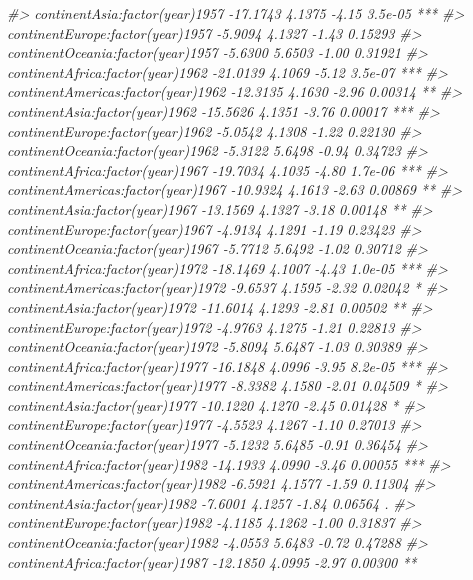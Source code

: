 \documentclass[]{book}
\newenvironment{Shaded}{\begin{snugshade}}{\end{snugshade}}
\newcommand{\CommentTok}[1]{\textcolor[rgb]{0.56,0.35,0.01}{\textit{#1}}}
\begin{document}
\begin{Shaded}
\begin{Highlighting}[]
\CommentTok{#> continentAsia:factor(year)1957     -17.1743     4.1375   -4.15  3.5e-05 ***}
\CommentTok{#> continentEurope:factor(year)1957    -5.9094     4.1327   -1.43  0.15293    }
\CommentTok{#> continentOceania:factor(year)1957   -5.6300     5.6503   -1.00  0.31921    }
\CommentTok{#> continentAfrica:factor(year)1962   -21.0139     4.1069   -5.12  3.5e-07 ***}
\CommentTok{#> continentAmericas:factor(year)1962 -12.3135     4.1630   -2.96  0.00314 ** }
\CommentTok{#> continentAsia:factor(year)1962     -15.5626     4.1351   -3.76  0.00017 ***}
\CommentTok{#> continentEurope:factor(year)1962    -5.0542     4.1308   -1.22  0.22130    }
\CommentTok{#> continentOceania:factor(year)1962   -5.3122     5.6498   -0.94  0.34723    }
\CommentTok{#> continentAfrica:factor(year)1967   -19.7034     4.1035   -4.80  1.7e-06 ***}
\CommentTok{#> continentAmericas:factor(year)1967 -10.9324     4.1613   -2.63  0.00869 ** }
\CommentTok{#> continentAsia:factor(year)1967     -13.1569     4.1327   -3.18  0.00148 ** }
\CommentTok{#> continentEurope:factor(year)1967    -4.9134     4.1291   -1.19  0.23423    }
\CommentTok{#> continentOceania:factor(year)1967   -5.7712     5.6492   -1.02  0.30712    }
\CommentTok{#> continentAfrica:factor(year)1972   -18.1469     4.1007   -4.43  1.0e-05 ***}
\CommentTok{#> continentAmericas:factor(year)1972  -9.6537     4.1595   -2.32  0.02042 *  }
\CommentTok{#> continentAsia:factor(year)1972     -11.6014     4.1293   -2.81  0.00502 ** }
\CommentTok{#> continentEurope:factor(year)1972    -4.9763     4.1275   -1.21  0.22813    }
\CommentTok{#> continentOceania:factor(year)1972   -5.8094     5.6487   -1.03  0.30389    }
\CommentTok{#> continentAfrica:factor(year)1977   -16.1848     4.0996   -3.95  8.2e-05 ***}
\CommentTok{#> continentAmericas:factor(year)1977  -8.3382     4.1580   -2.01  0.04509 *  }
\CommentTok{#> continentAsia:factor(year)1977     -10.1220     4.1270   -2.45  0.01428 *  }
\CommentTok{#> continentEurope:factor(year)1977    -4.5523     4.1267   -1.10  0.27013    }
\CommentTok{#> continentOceania:factor(year)1977   -5.1232     5.6485   -0.91  0.36454    }
\CommentTok{#> continentAfrica:factor(year)1982   -14.1933     4.0990   -3.46  0.00055 ***}
\CommentTok{#> continentAmericas:factor(year)1982  -6.5921     4.1577   -1.59  0.11304    }
\CommentTok{#> continentAsia:factor(year)1982      -7.6001     4.1257   -1.84  0.06564 .  }
\CommentTok{#> continentEurope:factor(year)1982    -4.1185     4.1262   -1.00  0.31837    }
\CommentTok{#> continentOceania:factor(year)1982   -4.0553     5.6483   -0.72  0.47288    }
\CommentTok{#> continentAfrica:factor(year)1987   -12.1850     4.0995   -2.97  0.00300 ** }

\end{Highlighting}
\end{Shaded}
\end{document}
